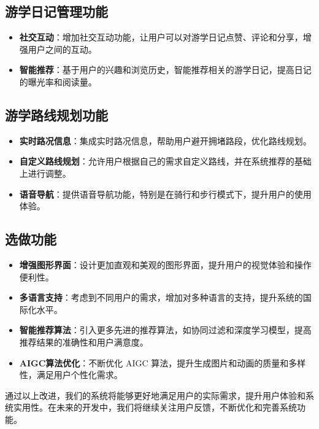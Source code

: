\documentclass{ctexart}
\begin{document}
\subsection{游学日记管理功能}

\begin{itemize}
    \item \textbf{社交互动}：增加社交互动功能，让用户可以对游学日记点赞、评论和分享，增强用户之间的互动。
    \item \textbf{智能推荐}：基于用户的兴趣和浏览历史，智能推荐相关的游学日记，提高日记的曝光率和阅读量。
\end{itemize}

\subsection{游学路线规划功能}

\begin{itemize}
    \item \textbf{实时路况信息}：集成实时路况信息，帮助用户避开拥堵路段，优化路线规划。
    \item \textbf{自定义路线规划}：允许用户根据自己的需求自定义路线，并在系统推荐的基础上进行调整。
    \item \textbf{语音导航}：提供语音导航功能，特别是在骑行和步行模式下，提升用户的使用体验。
\end{itemize}

\subsection{选做功能}

\begin{itemize}
    \item \textbf{增强图形界面}：设计更加直观和美观的图形界面，提升用户的视觉体验和操作便利性。
    \item \textbf{多语言支持}：考虑到不同用户的需求，增加对多种语言的支持，提升系统的国际化水平。
    \item \textbf{智能推荐算法}：引入更多先进的推荐算法，如协同过滤和深度学习模型，提高推荐结果的准确性和用户满意度。
    \item \textbf{AIGC算法优化}：不断优化 AIGC 算法，提升生成图片和动画的质量和多样性，满足用户个性化需求。
\end{itemize}

通过以上改进，我们的系统将能够更好地满足用户的实际需求，提升用户体验和系统实用性。在未来的开发中，我们将继续关注用户反馈，不断优化和完善系统功能。
\end{document}
